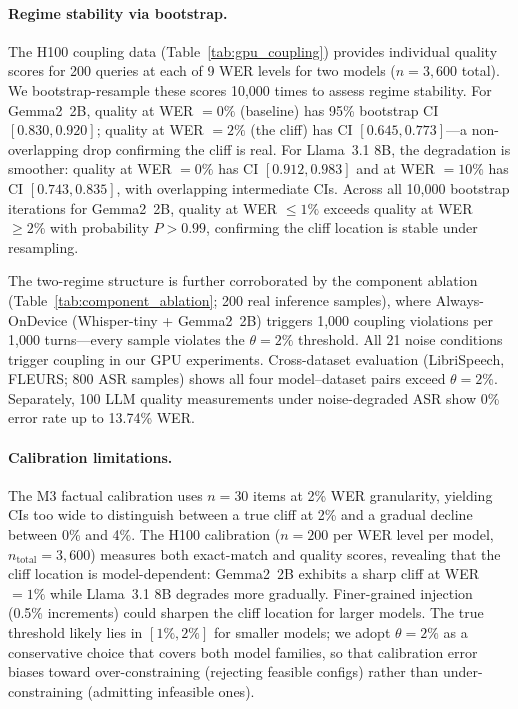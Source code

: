\documentclass{article}
\begin{document}
\paragraph{Regime stability via bootstrap.}
The H100 coupling data (Table~\ref{tab:gpu_coupling}) provides individual quality scores for 200 queries at each of 9 WER levels for two models ($n=3{,}600$ total). We bootstrap-resample these scores 10{,}000 times to assess regime stability. For Gemma2~2B, quality at WER $= 0\%$ (baseline) has 95\% bootstrap CI $[0.830, 0.920]$; quality at WER $= 2\%$ (the cliff) has CI $[0.645, 0.773]$---a non-overlapping drop confirming the cliff is real. For Llama~3.1 8B, the degradation is smoother: quality at WER $= 0\%$ has CI $[0.912, 0.983]$ and at WER $= 10\%$ has CI $[0.743, 0.835]$, with overlapping intermediate CIs. Across all 10{,}000 bootstrap iterations for Gemma2~2B, quality at WER $\leq 1\%$ exceeds quality at WER $\geq 2\%$ with probability $P > 0.99$, confirming the cliff location is stable under resampling.

The two-regime structure is further corroborated by the component ablation (Table~\ref{tab:component_ablation}; 200 real inference samples), where Always-OnDevice (Whisper-tiny + Gemma2~2B) triggers 1{,}000 coupling violations per 1{,}000 turns---every sample violates the $\theta = 2\%$ threshold. All 21 noise conditions trigger coupling in our GPU experiments. Cross-dataset evaluation (LibriSpeech, FLEURS; 800 ASR samples) shows all four model--dataset pairs exceed $\theta=2\%$. Separately, 100 LLM quality measurements under noise-degraded ASR show 0\% error rate up to 13.74\% WER.

\paragraph{Calibration limitations.} The M3 factual calibration uses $n = 30$ items at 2\% WER granularity, yielding CIs too wide to distinguish between a true cliff at 2\% and a gradual decline between 0\% and 4\%. The H100 calibration ($n=200$ per WER level per model, $n_{\text{total}}=3{,}600$) measures both exact-match and quality scores, revealing that the cliff location is model-dependent: Gemma2~2B exhibits a sharp cliff at WER $=1\%$ while Llama~3.1 8B degrades more gradually. Finer-grained injection (0.5\% increments) could sharpen the cliff location for larger models. The true threshold likely lies in $[1\%, 2\%]$ for smaller models; we adopt $\theta = 2\%$ as a conservative choice that covers both model families, so that calibration error biases toward over-constraining (rejecting feasible configs) rather than under-constraining (admitting infeasible ones).
\end{document}
